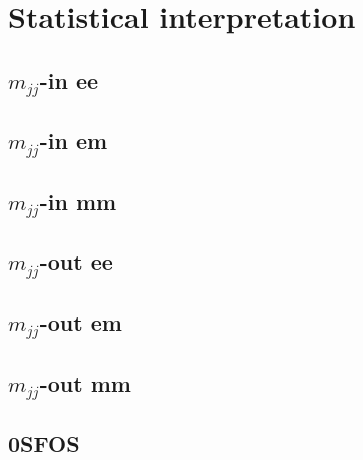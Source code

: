 \documentclass[12pt]{article}
\newcommand{\analysispath}{/home/users/phchang/public_html/analysis/www/code/WWWAnalysisRun2/analysis/plots/WWW2017_v4.0.6/test22}
\begin{document}


\clearpage

\section{Statistical interpretation}

\subsection{$m_{jj}$-in ee}
\subsection{$m_{jj}$-in em}
\subsection{$m_{jj}$-in mm}
\subsection{$m_{jj}$-out ee}
\subsection{$m_{jj}$-out em}
\subsection{$m_{jj}$-out mm}
\subsection{0SFOS}
\end{document}
